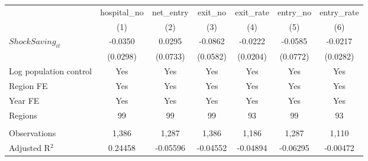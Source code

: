 \begingroup
\centering
\begin{tabular}{lcccccc}
   \toprule
                          & hospital\_no  & net\_entry  & exit\_no  & exit\_rate  & entry\_no  & entry\_rate \\    
                          & (1)           & (2)         & (3)       & (4)         & (5)        & (6)\\  
   \midrule 
   $ShockSaving_{it}$     & -0.0350       & 0.0295      & -0.0862   & -0.0222     & -0.0585    & -0.0217\\   
                          & (0.0298)      & (0.0733)    & (0.0582)  & (0.0204)    & (0.0772)   & (0.0282)\\   
   Log population control & Yes           & Yes         & Yes       & Yes         & Yes        & Yes\\  
   Region FE              & Yes           & Yes         & Yes       & Yes         & Yes        & Yes\\  
   Year FE                & Yes           & Yes         & Yes       & Yes         & Yes        & Yes\\  
   Regions                & 99            & 99          & 99        & 93          & 99         & 93\\  
    \\
   Observations           & 1,386         & 1,287       & 1,386     & 1,186       & 1,287      & 1,110\\  
   Adjusted R$^2$         & 0.24458       & -0.05596    & -0.04552  & -0.04894    & -0.06295   & -0.00472\\  
   \bottomrule
\end{tabular}
\par\endgroup
